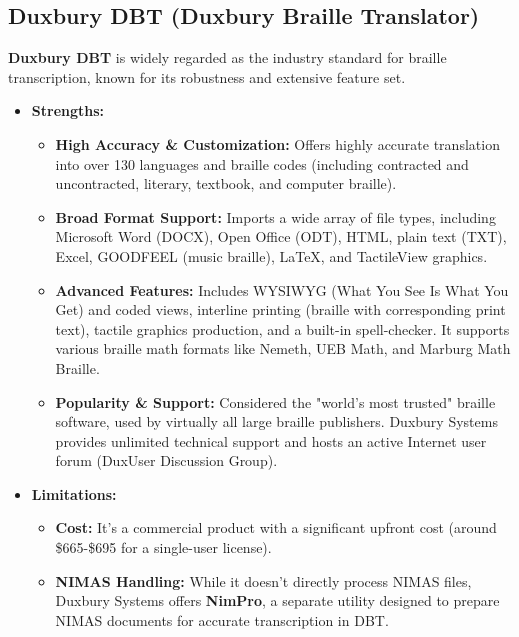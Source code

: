 \subsection{Duxbury DBT (Duxbury Braille Translator)}
\textbf{Duxbury DBT} is widely regarded as the industry standard for braille transcription, known for its robustness and extensive feature set.

\begin{itemize}
    \item \textbf{Strengths:}
    \begin{itemize}
        \item \textbf{High Accuracy \& Customization:} Offers highly accurate translation into over 130 languages and braille codes (including contracted and uncontracted, literary, textbook, and computer braille)\footnotemark{}.
        \item \textbf{Broad Format Support:} Imports a wide array of file types, including Microsoft Word (DOCX), Open Office (ODT), HTML, plain text (TXT), Excel, GOODFEEL (music braille), LaTeX, and TactileView graphics\footnotemark{}.
        \item \textbf{Advanced Features:} Includes WYSIWYG (What You See Is What You Get) and coded views, interline printing (braille with corresponding print text), tactile graphics production, and a built-in spell-checker. It supports various braille math formats like Nemeth, UEB Math, and Marburg Math Braille.
        \item \textbf{Popularity \& Support:} Considered the "world's most trusted" braille software, used by virtually all large braille publishers\footnotemark{}. Duxbury Systems provides unlimited technical support and hosts an active Internet user forum (DuxUser Discussion Group).
    \end{itemize}
    \item \textbf{Limitations:}
    \begin{itemize}
        \item \textbf{Cost:} It's a commercial product with a significant upfront cost (around \$665-\$695 for a single-user license)\footnotemark{}.
        \item \textbf{NIMAS Handling:} While it doesn't directly process NIMAS files, Duxbury Systems offers \textbf{NimPro}, a separate utility designed to prepare NIMAS documents for accurate transcription in DBT\footnotemark{}.

\end{itemize}
\end{itemize}
